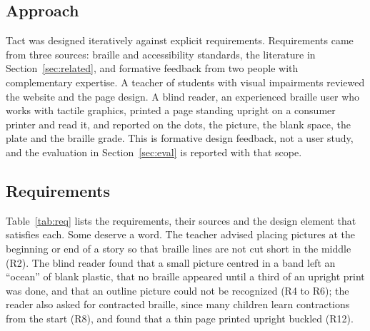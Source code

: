 \documentclass[conference]{IEEEtran}
\begin{document}
\subsection{Approach}

Tact was designed iteratively against explicit requirements. Requirements came from three sources: braille and accessibility standards, the literature in Section~\ref{sec:related}, and formative feedback from two people with complementary expertise. A teacher of students with visual impairments reviewed the website and the page design. A blind reader, an experienced braille user who works with tactile graphics, printed a page standing upright on a consumer printer and read it, and reported on the dots, the picture, the blank space, the plate and the braille grade. This is formative design feedback, not a user study, and the evaluation in Section~\ref{sec:eval} is reported with that scope.

\subsection{Requirements}

Table~\ref{tab:req} lists the requirements, their sources and the design element that satisfies each. Some deserve a word. The teacher advised placing pictures at the beginning or end of a story so that braille lines are not cut short in the middle (R2). The blind reader found that a small picture centred in a band left an ``ocean'' of blank plastic, that no braille appeared until a third of an upright print was done, and that an outline picture could not be recognized (R4 to R6); the reader also asked for contracted braille, since many children learn contractions from the start (R8), and found that a thin page printed upright buckled (R12).
\end{document}

